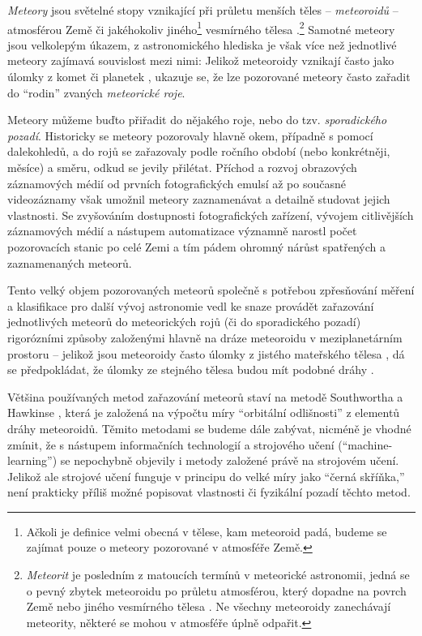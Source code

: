 
\textit{Meteory} jsou světelné stopy vznikající při průletu menších těles -- \textit{meteoroidů} -- atmosférou Země či jakéhokoliv jiného\footnote{Ačkoli je definice \cite{meteorastro} velmi obecná v tělese, kam meteoroid padá, budeme se zajímat pouze o meteory pozorované v atmosféře Země.} vesmírného tělesa \cite{meteorastro}.\footnote{\textit{Meteorit} je posledním z matoucích termínů v meteorické astronomii, jedná se o pevný zbytek meteoroidu po průletu atmosférou, který dopadne na povrch Země nebo jiného vesmírného tělesa \cite{meteorastro}. Ne všechny meteoroidy zanechávají meteority, některé se mohou v atmosféře úplně odpařit.} Samotné meteory jsou velkolepým úkazem, z astronomického hlediska je však více než jednotlivé meteory zajímavá souvislost mezi nimi: Jelikož meteoroidy vznikají často jako úlomky z komet či planetek \cite{meteorastro}\cite{cometassoc}, ukazuje se, že lze pozorované meteory často zařadit do "`rodin"' zvaných \textit{meteorické roje}.

Meteory můžeme buďto přiřadit do nějakého roje, nebo do tzv. \textit{sporadického pozadí}.  Historicky se meteory pozorovaly hlavně okem, případně s pomocí dalekohledů, a do rojů se zařazovaly podle ročního období (nebo konkrétněji, měsíce) a směru, odkud se jevily přilétat. Příchod a rozvoj obrazových záznamových médií od prvních fotografických emulsí až po současné videozáznamy však umožnil meteory zaznamenávat a detailně studovat jejich vlastnosti. Se zvyšováním dostupnosti fotografických zařízení, vývojem citlivějších záznamových médií a nástupem automatizace významně narostl počet pozorovacích stanic po celé Zemi a tím pádem ohromný nárůst spatřených a zaznamenaných meteorů.

Tento velký objem pozorovaných meteorů společně s potřebou zpřesňování měření a klasifikace pro další vývoj astronomie vedl ke snaze provádět zařazování jednotlivých meteorů do meteorických rojů (či do sporadického pozadí) rigorózními způsoby založenými hlavně na dráze meteoroidu \cite{dsh} v meziplanetárním prostoru -- jelikož jsou meteoroidy často úlomky z jistého mateřského tělesa \cite{meteorastro}\cite{cometassoc}, dá se předpokládat, že úlomky ze stejného tělesa budou mít podobné dráhy \cite{dsh}.

Většina používaných metod zařazování meteorů staví na metodě Southwortha a Hawkinse \cite{dsh}, která je založená na výpočtu míry "`orbitální odlišnosti"' z elementů dráhy meteoroidů. Těmito metodami se budeme dále zabývat, nicméně je vhodné zmínit, že s nástupem informačních technologií a strojového učení ("`machine-learning"') se nepochybně objevily i metody založené právě na strojovém učení. Jelikož ale strojové učení funguje v principu do velké míry jako "`černá skříňka,"' není prakticky příliš možné popisovat vlastnosti či fyzikální pozadí těchto metod.